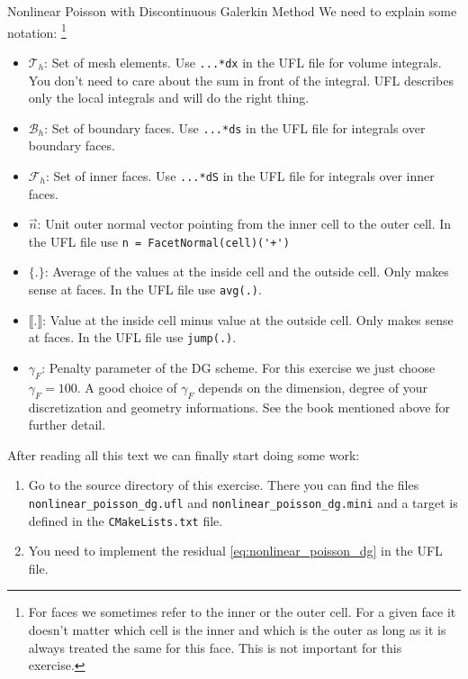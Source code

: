 \documentclass[12pt,a4paper]{article}
\newcommand\jump[1]{\llbracket #1 \rrbracket}
\newcommand\avg[1]{\{ #1 \}}
\begin{document}
\begin{Exercise}{Nonlinear Poisson with Discontinuous Galerkin Method}
  We need to explain some notation: \footnote{For faces we sometimes refer to the inner or the outer cell. For a given face it doesn't matter which cell is the inner and which is the outer as long as it is always treated the same for this face. This is not important for this exercise.}

  \begin{itemize}
  \item $\mathcal{T}_h$: Set of mesh elements. Use \lstinline{...*dx} in the
    UFL file for volume integrals. You don't need to care about the sum in
    front of the integral. UFL describes only the local integrals and will do
    the right thing.
  \item $\mathcal{B}_h$: Set of boundary faces. Use \lstinline{...*ds} in the
    UFL file for integrals over boundary faces.
  \item $\mathcal{F}_h$: Set of inner faces. Use \lstinline{...*dS} in the UFL
    file for integrals over inner faces.
  \item $\vec{n}$: Unit outer normal vector pointing from the inner cell to the
    outer cell. In the UFL file use \lstinline{n = FacetNormal(cell)('+')}
  \item $\avg{.}$: Average of the values at the inside cell and the outside
    cell. Only makes sense at faces. In the UFL file use \lstinline{avg(.)}.
  \item $\jump{.}$: Value at the inside cell minus value at the outside
    cell. Only makes sense at faces. In the UFL file use \lstinline{jump(.)}.
  \item $\gamma_F$: Penalty parameter of the DG scheme. For this exercise we
    just choose $\gamma_F = 100$. A good choice of $\gamma_F$ depends on the
    dimension, degree of your discretization and geometry informations. See the
    book mentioned above for further detail.
  \end{itemize}

  After reading all this text we can finally start doing some work:
  \begin{enumerate}
  \item Go to the source directory of this exercise. There you can find the
    files \lstinline{nonlinear_poisson_dg.ufl} and
    \lstinline{nonlinear_poisson_dg.mini} and a target is defined in the
    \lstinline{CMakeLists.txt} file.
  \item You need to implement the residual \eqref{eq:nonlinear_poisson_dg} in
    the UFL file.
  \end{enumerate}

\end{Exercise}
\end{document}
